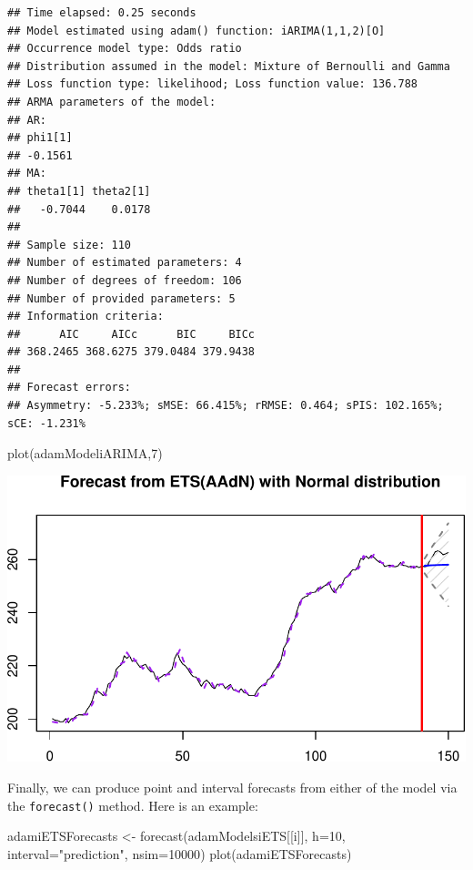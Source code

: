 \documentclass[
]{book}
\newenvironment{Shaded}{\begin{snugshade}}{\end{snugshade}}
\newcommand{\AttributeTok}[1]{\textcolor[rgb]{0.77,0.63,0.00}{#1}}
\newcommand{\DecValTok}[1]{\textcolor[rgb]{0.00,0.00,0.81}{#1}}
\newcommand{\FunctionTok}[1]{\textcolor[rgb]{0.00,0.00,0.00}{#1}}
\newcommand{\NormalTok}[1]{#1}
\newcommand{\OtherTok}[1]{\textcolor[rgb]{0.56,0.35,0.01}{#1}}
\newcommand{\StringTok}[1]{\textcolor[rgb]{0.31,0.60,0.02}{#1}}
\theoremstyle{definition}
\theoremstyle{definition}
\theoremstyle{definition}
\theoremstyle{definition}
\theoremstyle{remark}
\begin{document}
\begin{verbatim}
## Time elapsed: 0.25 seconds
## Model estimated using adam() function: iARIMA(1,1,2)[O]
## Occurrence model type: Odds ratio
## Distribution assumed in the model: Mixture of Bernoulli and Gamma
## Loss function type: likelihood; Loss function value: 136.788
## ARMA parameters of the model:
## AR:
## phi1[1] 
## -0.1561 
## MA:
## theta1[1] theta2[1] 
##   -0.7044    0.0178 
## 
## Sample size: 110
## Number of estimated parameters: 4
## Number of degrees of freedom: 106
## Number of provided parameters: 5
## Information criteria:
##      AIC     AICc      BIC     BICc 
## 368.2465 368.6275 379.0484 379.9438 
## 
## Forecast errors:
## Asymmetry: -5.233%; sMSE: 66.415%; rRMSE: 0.464; sPIS: 102.165%; sCE: -1.231%
\end{verbatim}

\begin{Shaded}
\begin{Highlighting}[]
\FunctionTok{plot}\NormalTok{(adamModeliARIMA,}\DecValTok{7}\NormalTok{)}
\end{Highlighting}
\end{Shaded}

\includegraphics{adam_files/figure-latex/unnamed-chunk-127-1.pdf}

Finally, we can produce point and interval forecasts from either of the model via the \texttt{forecast()} method. Here is an example:

\begin{Shaded}
\begin{Highlighting}[]
\NormalTok{adamiETSForecasts }\OtherTok{\textless{}{-}} \FunctionTok{forecast}\NormalTok{(adamModelsiETS[[i]], }\AttributeTok{h=}\DecValTok{10}\NormalTok{,}
                              \AttributeTok{interval=}\StringTok{"prediction"}\NormalTok{, }\AttributeTok{nsim=}\DecValTok{10000}\NormalTok{)}
\FunctionTok{plot}\NormalTok{(adamiETSForecasts)}
\end{Highlighting}
\end{Shaded}
\end{document}
